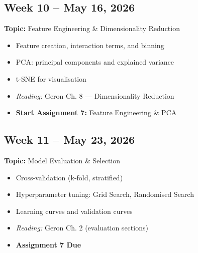 \documentclass[
  10pt,
]{article}
\providecommand{\tightlist}{%
  \setlength{\itemsep}{0pt}\setlength{\parskip}{0pt}}
\newenvironment{blackbox}{%
  \def\FrameCommand{%
    \hspace{1pt}%
    {\color{boxborder}\vrule width 2pt}%
    {\color{boxbg}\vrule width 4pt}%
    \colorbox{boxbg}%
  }%
  \MakeFramed{\advance\hsize-\width\FrameRestore}%
  \noindent\ignorespaces
}{%
  \endMakeFramed
}
\begin{document}
\begin{blackbox}

\begin{center}

\subsection{Week 10 -- May 16, 2026}\label{week-10-may-16-2026}

\end{center}

\textbf{Topic:} Feature Engineering \& Dimensionality Reduction

\begin{itemize}
\tightlist
\item
  Feature creation, interaction terms, and binning
\item
  PCA: principal components and explained variance
\item
  t-SNE for visualisation
\item
  \emph{Reading:} Geron Ch. 8 --- Dimensionality Reduction
\item
  \textbf{Start Assignment 7:} Feature Engineering \& PCA
\end{itemize}

\end{blackbox}

\begin{blackbox}

\begin{center}

\subsection{Week 11 -- May 23, 2026}\label{week-11-may-23-2026}

\end{center}

\textbf{Topic:} Model Evaluation \& Selection

\begin{itemize}
\tightlist
\item
  Cross-validation (k-fold, stratified)
\item
  Hyperparameter tuning: Grid Search, Randomised Search
\item
  Learning curves and validation curves
\item
  \emph{Reading:} Geron Ch. 2 (evaluation sections)
\item
  \textbf{Assignment 7 Due}
\end{itemize}

\end{blackbox}
\end{document}
